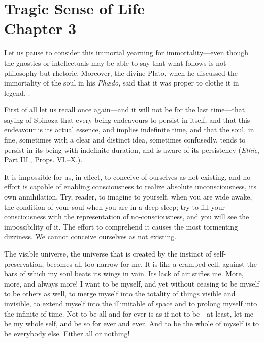 
\author{Miguel de Unamuno}
\chapter[Miguel de Unamuno -- Tragic Sense of Life, chap. 3]{Tragic
Sense of Life\\\smaller Chapter 3}


Let us pause to consider this immortal yearning for
immortality---even though the gnostics or intellectuals may be able to
say that what follows is not philosophy but rhetoric. Moreover, the
divine Plato, when he discussed the immortality of the soul in his
\textit{Ph\ae do}, said that it was proper to clothe it in legend,
.

First of all let us recall once again---and it will not be for the
last time---that saying of Spinoza that every being endeavours to
persist in itself, and that this endeavour is its actual essence, and
implies indefinite time, and that the soul, in fine, sometimes with a
clear and distinct idea, sometimes confusedly, tends to persist in its
being with indefinite duration, and is aware of its persistency
(\textit{Ethic}, Part III., Props. VI.--X.).

It is impossible for us, in effect, to conceive of ourselves as not
existing, and no effort is capable of enabling consciousness to
realize absolute unconsciousness, its own annihilation. Try, reader,
to imagine to yourself, when you are wide awake, the condition of your
soul when you are in a deep sleep; try to fill your consciousness with
the representation of no-consciousness, and you will see the
impossibility of it. The effort to comprehend it causes the most
tormenting dizziness. We cannot conceive ourselves as not existing.

The visible universe, the universe that is created by the instinct of
self-pre\-ser\-va\-tion, becomes all too narrow for me. It is like a
cramped cell, against the bars of which my soul beats its wings in
vain. Its lack of air stifles me. More, more, and always more! I want
to be myself, and yet without ceasing to be myself to be others
 as well, to merge myself into the totality of things visible
and invisible, to extend myself into the illimitable of space and to
prolong myself into the infinite of time. Not to be all and for ever
is as if not to be---at least, let me be my whole self, and be so for
ever and ever. And to be the whole of myself is to be everybody else.
Either all or nothing!

